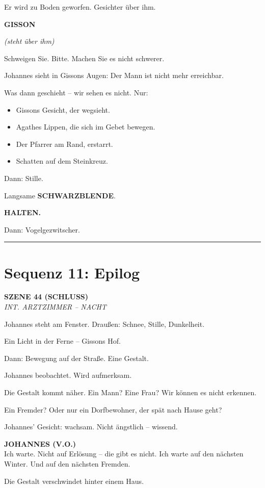 \documentclass[11pt,a4paper,twoside]{book}
\newcommand{\szene}[2]{%
    \vspace{1em}
    \noindent\textbf{\textsf{#1}}\\
    \textit{#2}
    \vspace{0.5em}
}
\newcommand{\figur}[1]{%
    \vspace{0.5em}
    \noindent\hspace{3cm}\textbf{\MakeUppercase{#1}}\\
    \hspace{3cm}
}
\newcommand{\regieanweisung}[1]{%
    \textit{(#1)}
}
\newcommand{\voiceover}[1]{%
    \begin{voiceoverbox}
    \textbf{JOHANNES (V.O.)}\\
    #1
    \end{voiceoverbox}
}
\begin{document}
Er wird zu Boden geworfen. Gesichter über ihm.

\begin{dialogbox}
\figur{Gisson}
\regieanweisung{steht über ihm}
Schweigen Sie. Bitte. Machen Sie es nicht schwerer.
\end{dialogbox}

Johannes sieht in Gissons Augen: Der Mann ist nicht mehr erreichbar.

Was dann geschieht -- wir sehen es nicht. Nur:

\begin{itemize}
    \item Gissons Gesicht, der wegsieht.
    \item Agathes Lippen, die sich im Gebet bewegen.
    \item Der Pfarrer am Rand, erstarrt.
    \item Schatten auf dem Steinkreuz.
\end{itemize}

Dann: Stille.

Langsame \textbf{SCHWARZBLENDE}.

\textbf{HALTEN.}

Dann: Vogelgezwitscher.

\vspace{1em}
\hrule
\vspace{1em}

\section*{Sequenz 11: Epilog}

\szene{SZENE 44 (SCHLUSS)}{INT. ARZTZIMMER -- NACHT}

Johannes steht am Fenster. Draußen: Schnee, Stille, Dunkelheit.

Ein Licht in der Ferne -- Gissons Hof.

Dann: Bewegung auf der Straße. Eine Gestalt.

Johannes beobachtet. Wird aufmerksam.

Die Gestalt kommt näher. Ein Mann? Eine Frau? Wir können es nicht erkennen.

Ein Fremder? Oder nur ein Dorfbewohner, der spät nach Hause geht?

Johannes' Gesicht: wachsam. Nicht ängstlich -- wissend.

\voiceover{Ich warte. Nicht auf Erlösung -- die gibt es nicht. Ich warte auf den nächsten Winter. Und auf den nächsten Fremden.}

Die Gestalt verschwindet hinter einem Haus.
\end{document}
